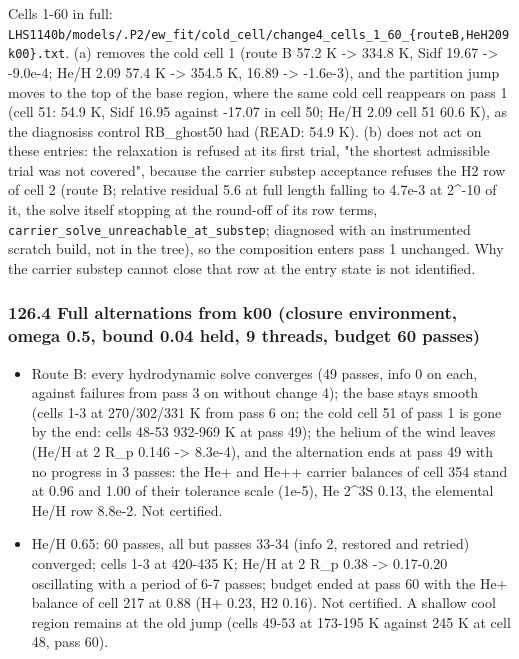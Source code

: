 \documentclass[english,a4paper]{my_memo}
\providecommand{\tightlist}{\setlength{\itemsep}{0pt}\setlength{\parskip}{0pt}}
\begin{document}
Cells 1-60 in full: \texttt{LHS1140b/models/.P2/ew\_fit/cold\_cell/change4\_cells\_1\_60\_\{routeB,HeH209k00\}.txt}. (a) removes the cold cell 1 (route B 57.2 K -\textgreater{} 334.8 K, Sidf 19.67 -\textgreater{} -9.0e-4; He/H 2.09 57.4 K -\textgreater{} 354.5 K, 16.89 -\textgreater{} -1.6e-3), and the partition jump moves to the top of the base region, where the same cold cell reappears on pass 1 (cell 51: 54.9 K, Sidf 16.95 against -17.07 in cell 50; He/H 2.09 cell 51 60.6 K), as the diagnosis\textquotesingle s control RB\_ghost50 had (READ: 54.9 K). (b) does not act on these entries: the relaxation is refused at its first trial, "the shortest admissible trial was not covered", because the carrier substep acceptance refuses the H2 row of cell 2 (route B; relative residual 5.6 at full length falling to 4.7e-3 at 2\^{}-10 of it, the solve itself stopping at the round-off of its row terms, \texttt{carrier\_solve\_unreachable\_at\_substep}; diagnosed with an instrumented scratch build, not in the tree), so the composition enters pass 1 unchanged. Why the carrier substep cannot close that row at the entry state is not identified.

\subsubsection{126.4 Full alternations from k00 (closure environment, omega 0.5, bound 0.04 held, 9 threads, budget 60 passes)}\label{1264-full-alternations-from-k00-closure-environment-omega-05-bound-004-held-9-threads-budget-60-passes}

\begin{itemize}
\tightlist
\item
  Route B: every hydrodynamic solve converges (49 passes, info 0 on each, against failures from pass 3 on without change 4); the base stays smooth (cells 1-3 at 270/302/331 K from pass 6 on; the cold cell 51 of pass 1 is gone by the end: cells 48-53 932-969 K at pass 49); the helium of the wind leaves (He/H at 2 R\_p 0.146 -\textgreater{} 8.3e-4), and the alternation ends at pass 49 with no progress in 3 passes: the He+ and He++ carrier balances of cell 354 stand at 0.96 and 1.00 of their tolerance scale (1e-5), He 2\^{}3S 0.13, the elemental He/H row 8.8e-2. Not certified.
\item
  He/H 0.65: 60 passes, all but passes 33-34 (info 2, restored and retried) converged; cells 1-3 at 420-435 K; He/H at 2 R\_p 0.38 -\textgreater{} 0.17-0.20 oscillating with a period of 6-7 passes; budget ended at pass 60 with the He+ balance of cell 217 at 0.88 (H+ 0.23, H2 0.16). Not certified. A shallow cool region remains at the old jump (cells 49-53 at 173-195 K against 245 K at cell 48, pass 60).
\end{itemize}
\end{document}
